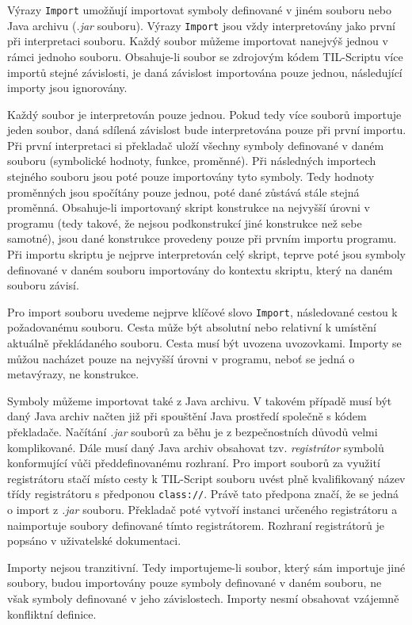 Výrazy \lstinline{Import} umožňují importovat symboly definované v jiném souboru nebo Java archivu
(\textit{.jar} souboru). Výrazy \lstinline{Import} jsou vždy interpretovány jako první při
interpretaci souboru. Každý soubor můžeme importovat nanejvýš jednou v rámci jednoho souboru.
Obsahuje-li soubor se zdrojovým kódem TIL-Scriptu více importů stejné závislosti, je daná závislost
importována pouze jednou, následující importy jsou ignorovány.

Každý soubor je interpretován pouze jednou. Pokud tedy více souborů importuje jeden soubor, daná
sdílená závislost bude interpretována pouze při první importu. Při první interpretaci si překladač
uloží všechny symboly definované v daném souboru (symbolické hodnoty, funkce, proměnné).
Při následných importech stejného souboru jsou poté pouze importovány tyto symboly. Tedy hodnoty
proměnných jsou spočítány pouze jednou, poté dané zůstává stále stejná proměnná. Obsahuje-li
importovaný skript konstrukce na nejvyšší úrovni v programu (tedy takové, že nejsou podkonstrukcí
jiné konstrukce než sebe samotné), jsou dané konstrukce provedeny pouze při prvním importu
programu. Při importu skriptu je nejprve interpretován celý skript, teprve poté jsou symboly
definované v daném souboru importovány do kontextu skriptu, který na daném souboru závisí.

Pro import souboru uvedeme nejprve klíčové slovo \lstinline{Import}, následované cestou
k požadovanému souboru. Cesta může být absolutní nebo relativní k umístění aktuálně překládaného
souboru. Cesta musí být uvozena uvozovkami. Importy se můžou nacházet pouze na nejvyšší úrovni
v programu, neboť se jedná o metavýrazy, ne konstrukce.

Symboly můžeme importovat také z Java archivu. V takovém případě musí být daný Java archiv načten
již při spouštění Java prostředí společně s kódem překladače. Načítání \textit{.jar} souborů
za běhu je z bezpečnostních důvodů velmi komplikované. Dále musí daný Java archiv obsahovat tzv.
\textit{registrátor} symbolů konformující vůči předdefinovanému rozhraní. Pro import souborů
za využití registrátoru stačí místo cesty k TIL-Script souboru uvést plně kvalifikovaný název
třídy registrátoru s předponou \lstinline{class://}. Právě tato předpona značí, že se jedná o
import z \textit{.jar} souboru. Překladač poté vytvoří instanci určeného registrátoru a naimportuje
soubory definované tímto registrátorem. Rozhraní registrátorů je popsáno v uživatelské dokumentaci.

Importy nejsou tranzitivní. Tedy importujeme-li soubor, který sám importuje jiné soubory, budou
importovány pouze symboly definované v daném souboru, ne však symboly definované v jeho
závislostech. Importy nesmí obsahovat vzájemně konfliktní definice.


